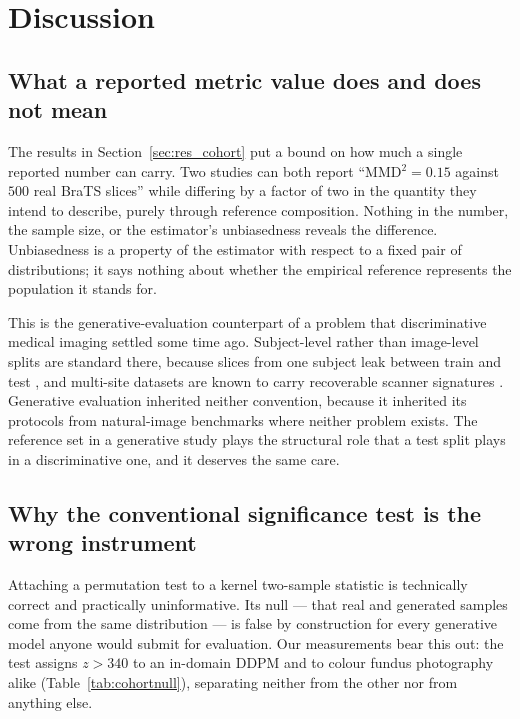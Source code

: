\documentclass[preprint,12pt,authoryear]{elsarticle}
\begin{document}
\section{Discussion}
\label{sec:discussion}

\subsection{What a reported metric value does and does not mean}

The results in Section~\ref{sec:res_cohort} put a bound on how much a single
reported number can carry. Two studies can both report ``MMD$^2 = 0.15$ against
$500$ real BraTS slices'' while differing by a factor of two in the quantity
they intend to describe, purely through reference composition. Nothing in the
number, the sample size, or the estimator's unbiasedness reveals the
difference. Unbiasedness is a property of the estimator with respect to a fixed
pair of distributions; it says nothing about whether the empirical reference
represents the population it stands for.

This is the generative-evaluation counterpart of a problem that discriminative
medical imaging settled some time ago. Subject-level rather than image-level
splits are standard there, because slices from one subject leak between train
and test \citep{varoquaux2022machine}, and multi-site datasets are known to
carry recoverable scanner signatures \citep{glocker2019machine}. Generative
evaluation inherited neither convention, because it inherited its protocols from
natural-image benchmarks where neither problem exists. The reference set in a
generative study plays the structural role that a test split plays in a
discriminative one, and it deserves the same care.

\subsection{Why the conventional significance test is the wrong instrument}

Attaching a permutation test to a kernel two-sample statistic is technically
correct and practically uninformative. Its null --- that real and generated
samples come from the same distribution --- is false by construction for every
generative model anyone would submit for evaluation. Our measurements bear this
out: the test assigns $z > 340$ to an in-domain DDPM and to colour fundus
photography alike (Table~\ref{tab:cohortnull}), separating neither from the
other nor from anything else.
\end{document}
